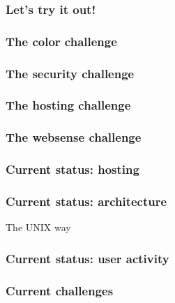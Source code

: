 \documentclass[aspectratio=169]{beamer}
\begin{document}
\begin{frame}
\frametitle{Let's try it out!}
\end{frame}

\begin{frame}
\frametitle{The color challenge}
\end{frame}

\begin{frame}
\frametitle{The security challenge}
\end{frame}

\begin{frame}
\frametitle{The hosting challenge}
\end{frame}

\begin{frame}
\frametitle{The websense challenge}
\end{frame}

\begin{frame}
\frametitle{Current status: hosting}
\end{frame}

\begin{frame}
\frametitle{Current status: architecture}
The UNIX way
\end{frame}

\begin{frame}
\frametitle{Current status: user activity}
\end{frame}

\begin{frame}
\frametitle{Current challenges}
\end{frame}
\end{document}
